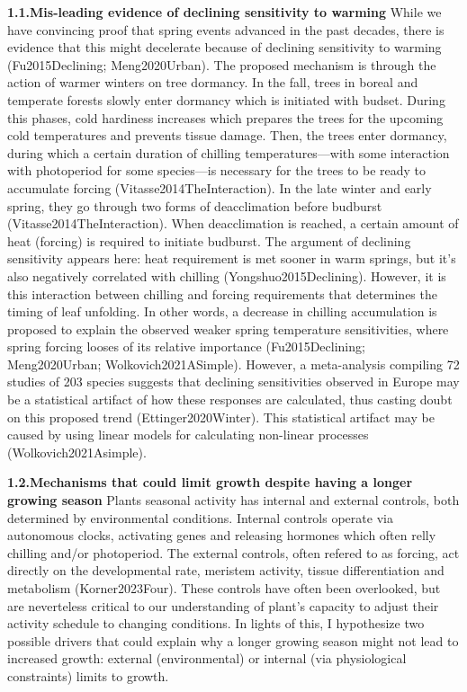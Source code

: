 \documentclass{article}
\begin{document}
\textbf{1.1.Mis-leading evidence of declining sensitivity to warming}
While we have convincing proof that spring events advanced in the past decades, there is evidence that this might decelerate because of declining sensitivity to warming (Fu2015Declining; Meng2020Urban). The proposed mechanism is through the action of warmer winters on tree dormancy. In the fall, trees in boreal and temperate forests slowly enter dormancy which is initiated with budset. During this phases, cold hardiness increases which prepares the trees for the upcoming cold temperatures and prevents tissue damage. Then, the trees enter dormancy, during which a certain duration of chilling temperatures---with some interaction with photoperiod for some species---is necessary for the trees to be ready to accumulate forcing (Vitasse2014TheInteraction). In the late winter and early spring, they go through two forms of deacclimation before budburst (Vitasse2014TheInteraction). When deacclimation is reached, a certain amount of heat (forcing) is required to initiate budburst. The argument of declining sensitivity appears here: heat requirement is met sooner in warm springs, but it's also negatively correlated with chilling (Yongshuo2015Declining). However, it is this interaction between chilling and forcing requirements that determines the timing of leaf unfolding. In other words, a decrease in chilling accumulation is proposed to explain the observed weaker spring temperature sensitivities, where spring forcing looses of its relative importance (Fu2015Declining; Meng2020Urban; Wolkovich2021ASimple). However, a meta-analysis compiling 72 studies of 203 species suggests that declining sensitivities observed in Europe may be a statistical artifact of how these responses are calculated, thus casting doubt on this proposed trend (Ettinger2020Winter). This statistical artifact may be caused by using linear models for calculating non-linear processes (Wolkovich2021Asimple).

\textbf{1.2.Mechanisms that could limit growth despite having a longer growing season}
Plants seasonal activity has internal and external controls, both determined by environmental conditions. Internal controls operate via autonomous clocks, activating genes and releasing hormones which often relly chilling and/or photoperiod. The external controls, often refered to as forcing, act directly on the developmental rate, meristem activity, tissue differentiation and metabolism (Korner2023Four). These controls have often been overlooked, but are neverteless critical to our understanding of plant's capacity to adjust their activity schedule to changing conditions. In lights of this, I hypothesize two possible drivers that could explain why a longer growing season might not lead to increased growth: external (environmental) \cite{kolar_response_2016} or internal (via physiological constraints)\cite{zohner_effect_2023} limits to growth. 
\end{document}
